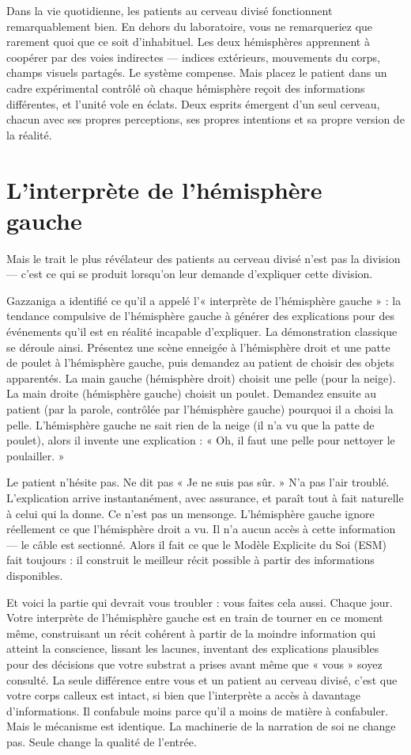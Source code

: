 \documentclass[11pt, twoside, openright]{book}
\begin{document}
Dans la vie quotidienne, les patients au cerveau divisé fonctionnent remarquablement bien. En dehors du laboratoire, vous ne remarqueriez que rarement quoi que ce soit d'inhabituel. Les deux hémisphères apprennent à coopérer par des voies indirectes --- indices extérieurs, mouvements du corps, champs visuels partagés. Le système compense. Mais placez le patient dans un cadre expérimental contrôlé où chaque hémisphère reçoit des informations différentes, et l'unité vole en éclats. Deux esprits émergent d'un seul cerveau, chacun avec ses propres perceptions, ses propres intentions et sa propre version de la réalité.

\section*{L'interprète de l'hémisphère gauche}

Mais le trait le plus révélateur des patients au cerveau divisé n'est pas la division --- c'est ce qui se produit lorsqu'on leur demande d'expliquer cette division.

Gazzaniga a identifié ce qu'il a appelé l'« interprète de l'hémisphère gauche » : la tendance compulsive de l'hémisphère gauche à générer des explications pour des événements qu'il est en réalité incapable d'expliquer. La démonstration classique se déroule ainsi. Présentez une scène enneigée à l'hémisphère droit et une patte de poulet à l'hémisphère gauche, puis demandez au patient de choisir des objets apparentés. La main gauche (hémisphère droit) choisit une pelle (pour la neige). La main droite (hémisphère gauche) choisit un poulet. Demandez ensuite au patient (par la parole, contrôlée par l'hémisphère gauche) pourquoi il a choisi la pelle. L'hémisphère gauche ne sait rien de la neige (il n'a vu que la patte de poulet), alors il invente une explication : « Oh, il faut une pelle pour nettoyer le poulailler. »

Le patient n'hésite pas. Ne dit pas « Je ne suis pas sûr. » N'a pas l'air troublé. L'explication arrive instantanément, avec assurance, et paraît tout à fait naturelle à celui qui la donne. Ce n'est pas un mensonge. L'hémisphère gauche ignore réellement ce que l'hémisphère droit a vu. Il n'a aucun accès à cette information --- le câble est sectionné. Alors il fait ce que le Modèle Explicite du Soi (ESM) fait toujours : il construit le meilleur récit possible à partir des informations disponibles.

Et voici la partie qui devrait vous troubler : vous faites cela aussi. Chaque jour. Votre interprète de l'hémisphère gauche est en train de tourner en ce moment même, construisant un récit cohérent à partir de la moindre information qui atteint la conscience, lissant les lacunes, inventant des explications plausibles pour des décisions que votre substrat a prises avant même que « vous » soyez consulté. La seule différence entre vous et un patient au cerveau divisé, c'est que votre corps calleux est intact, si bien que l'interprète a accès à davantage d'informations. Il confabule moins parce qu'il a moins de matière à confabuler. Mais le mécanisme est identique. La machinerie de la narration de soi ne change pas. Seule change la qualité de l'entrée.
\end{document}

